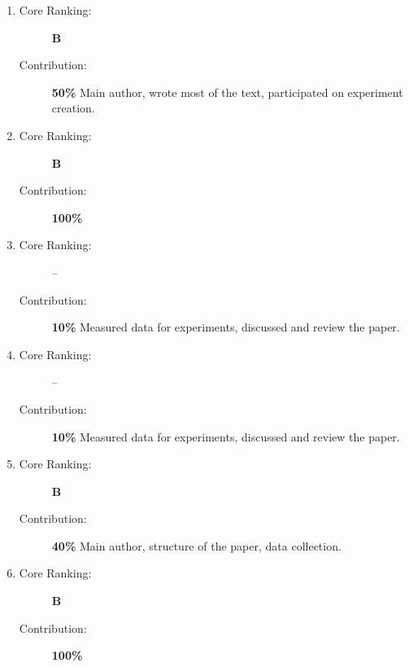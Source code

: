 \begin{enumerate}
  \item {} 
  \begin{description}
    \item[Core Ranking:] \textbf{B}
    \item[Contribution:] \textbf{50\%} Main author, wrote most of the text, participated on experiment creation. %
  \end{description}

  \item {} 
  \begin{description}
    \item[Core Ranking:] \textbf{B}
    \item[Contribution:] \textbf{100\%}
  \end{description}

  \item {} 
  \begin{description}
    \item[Core Ranking:] --
    \item[Contribution:] \textbf{10\%} Measured data for experiments, discussed and review the paper.
  \end{description}
  
  \item {}
  \begin{description}
    \item[Core Ranking:] --
    \item[Contribution:] \textbf{10\%} Measured data for experiments, discussed and review the paper.
  \end{description}
  
  \item {}
  \begin{description}
    \item[Core Ranking:] \textbf{B}
    \item[Contribution:] \textbf{40\%} Main author, structure of the paper, data collection.
  \end{description}
  
  \item {}
  \begin{description}
    \item[Core Ranking:] \textbf{B}
    \item[Contribution:] \textbf{100\%}
  \end{description}  
  

\end{enumerate}

